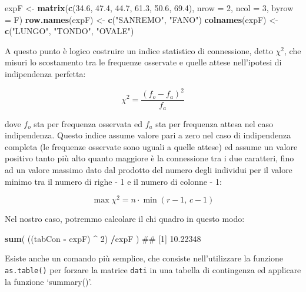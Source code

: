 \documentclass[a4paper,12pt,oneside]{book}
\newenvironment{Shaded}{\begin{snugshade}}{\end{snugshade}}
\newcommand{\KeywordTok}[1]{\textcolor[rgb]{0.13,0.29,0.53}{\textbf{#1}}}
\newcommand{\DataTypeTok}[1]{\textcolor[rgb]{0.13,0.29,0.53}{#1}}
\newcommand{\DecValTok}[1]{\textcolor[rgb]{0.00,0.00,0.81}{#1}}
\newcommand{\FloatTok}[1]{\textcolor[rgb]{0.00,0.00,0.81}{#1}}
\newcommand{\StringTok}[1]{\textcolor[rgb]{0.31,0.60,0.02}{#1}}
\newcommand{\OperatorTok}[1]{\textcolor[rgb]{0.81,0.36,0.00}{\textbf{#1}}}
\newcommand{\NormalTok}[1]{#1}
\theoremstyle{definition}
\theoremstyle{definition}
\theoremstyle{definition}
\theoremstyle{remark}
\begin{document}
\begin{Shaded}
\begin{Highlighting}[]
\NormalTok{expF <-}\StringTok{ }\KeywordTok{matrix}\NormalTok{(}\KeywordTok{c}\NormalTok{(}\FloatTok{34.6}\NormalTok{, }\FloatTok{47.4}\NormalTok{, }\FloatTok{44.7}\NormalTok{, }\FloatTok{61.3}\NormalTok{, }\FloatTok{50.6}\NormalTok{, }\FloatTok{69.4}\NormalTok{), }
                 \DataTypeTok{nrow =} \DecValTok{2}\NormalTok{, }\DataTypeTok{ncol =} \DecValTok{3}\NormalTok{,}
                 \DataTypeTok{byrow =}\NormalTok{ F)}
\KeywordTok{row.names}\NormalTok{(expF) <-}\StringTok{ }\KeywordTok{c}\NormalTok{(}\StringTok{"SANREMO"}\NormalTok{, }\StringTok{"FANO"}\NormalTok{)}
\KeywordTok{colnames}\NormalTok{(expF) <-}\StringTok{ }\KeywordTok{c}\NormalTok{(}\StringTok{"LUNGO"}\NormalTok{, }\StringTok{"TONDO"}\NormalTok{, }\StringTok{"OVALE"}\NormalTok{)}
\end{Highlighting}
\end{Shaded}

A questo punto è logico costruire un indice statistico di connessione,
detto \(\chi^2\), che misuri lo scostamento tra le frequenze osservate e
quelle attese nell'ipotesi di indipendenza perfetta:

\[\chi ^2  = \frac{{\left( {f_o  - f_a } \right)^2 }}{{f_a }}\]

dove \(f_o\) sta per frequenza osservata ed \(f_a\) sta per frequenza
attesa nel caso indipendenza. Questo indice assume valore pari a zero
nel caso di indipendenza completa (le frequenze osservate sono uguali a
quelle attese) ed assume un valore positivo tanto più alto quanto
maggiore è la connessione tra i due caratteri, fino ad un valore massimo
dato dal prodotto del numero degli individui per il valore minimo tra il
numero di righe - 1 e il numero di colonne - 1:

\[\max \chi ^2  = n \cdot \min (r - 1,\,c - 1)\]

Nel nostro caso, potremmo calcolare il chi quadro in questo modo:

\begin{Shaded}
\begin{Highlighting}[]
\KeywordTok{sum}\NormalTok{( ((tabCon }\OperatorTok{-}\StringTok{ }\NormalTok{expF) }\OperatorTok{^}\StringTok{ }\DecValTok{2}\NormalTok{) }\OperatorTok{/}\NormalTok{expF )}
\NormalTok{## [1] 10.22348}
\end{Highlighting}
\end{Shaded}

Esiste anche un comando più semplice, che consiste nell'utilizzare la
funzione \texttt{as.table()} per forzare la matrice \texttt{dati} in una
tabella di contingenza ed applicare la funzione `summary()'.
\end{document}
